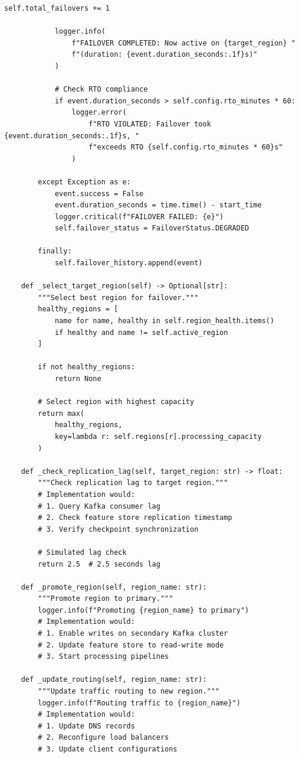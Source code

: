 \begin{lstlisting}[style=python, caption={Disaster Recovery Manager}]
            self.total_failovers += 1

            logger.info(
                f"FAILOVER COMPLETED: Now active on {target_region} "
                f"(duration: {event.duration_seconds:.1f}s)"
            )

            # Check RTO compliance
            if event.duration_seconds > self.config.rto_minutes * 60:
                logger.error(
                    f"RTO VIOLATED: Failover took {event.duration_seconds:.1f}s, "
                    f"exceeds RTO {self.config.rto_minutes * 60}s"
                )

        except Exception as e:
            event.success = False
            event.duration_seconds = time.time() - start_time
            logger.critical(f"FAILOVER FAILED: {e}")
            self.failover_status = FailoverStatus.DEGRADED

        finally:
            self.failover_history.append(event)

    def _select_target_region(self) -> Optional[str]:
        """Select best region for failover."""
        healthy_regions = [
            name for name, healthy in self.region_health.items()
            if healthy and name != self.active_region
        ]

        if not healthy_regions:
            return None

        # Select region with highest capacity
        return max(
            healthy_regions,
            key=lambda r: self.regions[r].processing_capacity
        )

    def _check_replication_lag(self, target_region: str) -> float:
        """Check replication lag to target region."""
        # Implementation would:
        # 1. Query Kafka consumer lag
        # 2. Check feature store replication timestamp
        # 3. Verify checkpoint synchronization

        # Simulated lag check
        return 2.5  # 2.5 seconds lag

    def _promote_region(self, region_name: str):
        """Promote region to primary."""
        logger.info(f"Promoting {region_name} to primary")
        # Implementation would:
        # 1. Enable writes on secondary Kafka cluster
        # 2. Update feature store to read-write mode
        # 3. Start processing pipelines

    def _update_routing(self, region_name: str):
        """Update traffic routing to new region."""
        logger.info(f"Routing traffic to {region_name}")
        # Implementation would:
        # 1. Update DNS records
        # 2. Reconfigure load balancers
        # 3. Update client configurations


\end{lstlisting}
